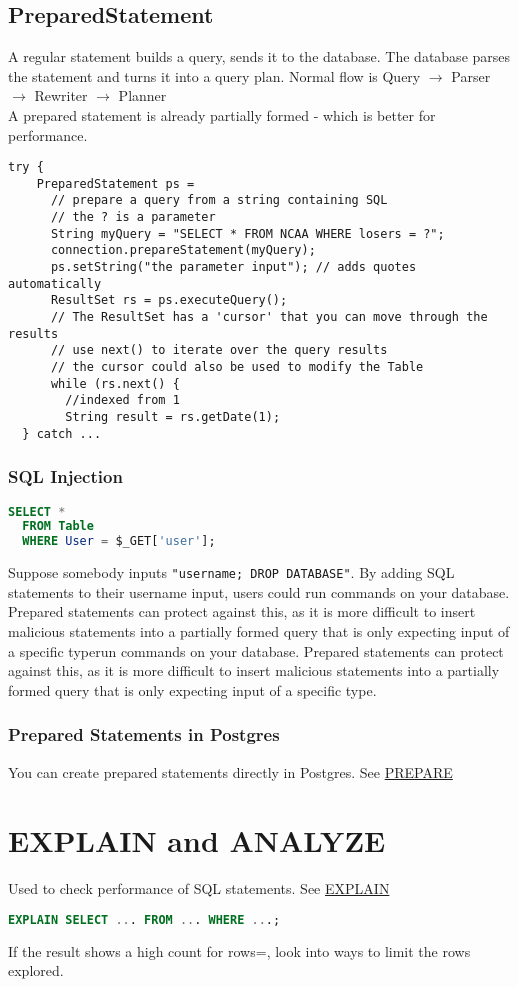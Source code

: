 \documentclass[12pt]{article}
\begin{document}
\subsection{PreparedStatement}
A regular statement builds a query, sends it to the database. The database
parses the statement and turns it into a query plan.
Normal flow is
Query $\rightarrow$ Parser $\rightarrow$ Rewriter $\rightarrow$ Planner\\
A prepared statement is already partially formed - which is better for
performance.
\begin{lstlisting}[caption=prepared statement]
  try {
    PreparedStatement ps =
      // prepare a query from a string containing SQL
      // the ? is a parameter
      String myQuery = "SELECT * FROM NCAA WHERE losers = ?";
      connection.prepareStatement(myQuery);
      ps.setString("the parameter input"); // adds quotes automatically
      ResultSet rs = ps.executeQuery();
      // The ResultSet has a 'cursor' that you can move through the results
      // use next() to iterate over the query results
      // the cursor could also be used to modify the Table
      while (rs.next() {
        //indexed from 1
        String result = rs.getDate(1);
  } catch ...
\end{lstlisting}

\subsubsection{SQL Injection}
\begin{lstlisting}[language=sql,caption=a simple query]
  SELECT *
  FROM Table
  WHERE User = $_GET['user'];
\end{lstlisting}
Suppose somebody inputs \lstinline{"username; DROP DATABASE"}. By adding SQL
statements to their username input, users could run commands on your database.
Prepared statements can protect against this, as it is more difficult to insert
malicious statements into a partially formed query that is only expecting input
of a specific typerun commands on your database. Prepared statements can protect
against this, as it is more difficult to insert malicious statements into a
partially formed query that is only expecting input of a specific type.
\subsubsection{Prepared Statements in Postgres}
You can create prepared statements directly in Postgres.
See \href{http://www.postgresql.org/docs/9.2/static/sql-prepare.html}{PREPARE}

\section{EXPLAIN and ANALYZE}
Used to check performance of SQL statements.
See \href{http://www.postgresql.org/docs/9.2/static/sql-explain.html}{EXPLAIN}
\begin{lstlisting}[language=sql,caption=a simple query]
  EXPLAIN SELECT ... FROM ... WHERE ...;
\end{lstlisting}
If the result shows a high count for rows=, look into ways to limit the rows
explored.
\end{document}
